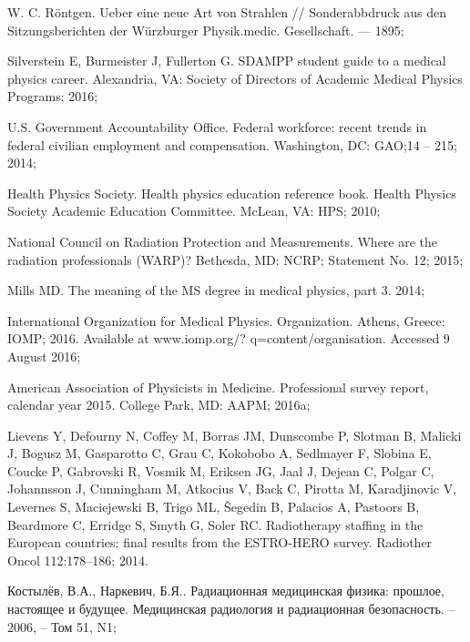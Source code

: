 \documentclass[a4paper,10pt]{extarticle}
\begin{document}
\begin{thebibliography}{99} %

W. C. Röntgen. Ueber eine neue Art von Strahlen // Sonderabbdruck aus den Sitzungsberichten der Würzburger Physik.medic. Gesellschaft. — 1895;

Silverstein E, Burmeister J, Fullerton G. SDAMPP student guide to a medical physics career. Alexandria, VA: Society of Directors of Academic Medical Physics Programs; 2016;

U.S. Government Accountability Office. Federal workforce: recent trends in federal civilian employment and compensation. Washington, DC: GAO;14 -- 215; 2014;

Health Physics Society. Health physics education reference book. Health Physics Society Academic Education Committee. McLean, VA: HPS; 2010;

National Council on Radiation Protection and Measurements. Where are the radiation professionals (WARP)? Bethesda, MD: NCRP; Statement No. 12; 2015;

Mills MD. The meaning of the MS degree in medical physics, part 3. 2014;

International Organization for Medical Physics. Organization. Athens, Greece: IOMP; 2016. Available at www.iomp.org/? q=content/organisation. Accessed 9 August 2016;

American Association of Physicists in Medicine. Professional survey report, calendar year 2015. College Park, MD: AAPM; 2016a;

Lievens Y, Defourny N, Coffey M, Borras JM, Dunscombe P, Slotman B, Malicki J, Bogusz M, Gasparotto C, Grau C, Kokobobo A, Sedlmayer F, Slobina E, Coucke P, Gabrovski R, Vosmik M, Eriksen JG, Jaal J, Dejean C, Polgar C, Johannsson J, Cunningham M, Atkocius V, Back C, Pirotta M, Karadjinovic V, Levernes S, Maciejewski B, Trigo ML, Šegedin B, Palacios A, Pastoors B, Beardmore C, Erridge S, Smyth G, Soler RC. Radiotherapy staffing in the European countries: final results from the ESTRO-HERO survey. Radiother Oncol 112:178–186; 2014.


Костылёв, В.А., Наркевич, Б.Я.. Радиационная медицинская физика: прошлое, настоящее и будущее. Медицинская радиология и радиационная безопасность. -- 2006, --  Том 51, N1;


\end{thebibliography}
\end{document}

